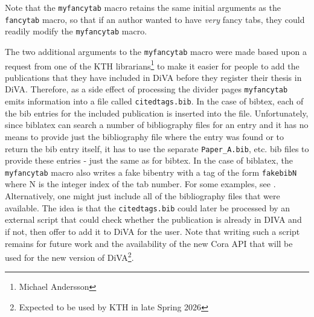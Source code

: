 \documentclass[12pt, twoside]{article}
\begin{document}
Note that the \texttt{myfancytab} macro retains the same initial arguments as the \texttt{fancytab} macro, so that if an author wanted to have \textit{very} fancy tabs, they could readily modify the \texttt{myfancytab} macro.

The two additional arguments to the \texttt{myfancytab} macro were made based upon a request from one of the KTH librarians\footnote{Michael Andersson} to make it easier for people to add the publications that they have included in DiVA before they register their thesis in DiVA. Therefore, as a side effect of processing the divider pages \texttt{myfancytab} emits information into a file called \texttt{citedtags.bib}. In the case of bibtex, each of the bib entries for the included publication is inserted into the file. Unfortunately, since biblatex can search a number of bibliography files for an entry and it has no means to provide just the bibliography file where the entry was found or to return the bib entry itself, it has to use the separate \texttt{Paper\_A.bib}, etc. bib files to provide these entries - just the same as for bibtex. In the case of biblatex, the \texttt{myfancytab} macro also writes a fake bibentry with a tag of the form \texttt{fakebibN} where N is the integer index of the tab number. For some examples, see .  Alternatively, one might just include all of the bibliography files that were available. The idea is that the \texttt{citedtags.bib} could later be processed by an external script that could check whether the publication is already in DIVA and if not, then offer to add it to DiVA for the user. Note that writing such a script remains for future work and the availability of the new Cora API that will be used for the new version of DiVA\footnote{Expected to be used by KTH in late Spring 2026}.
\end{document}
